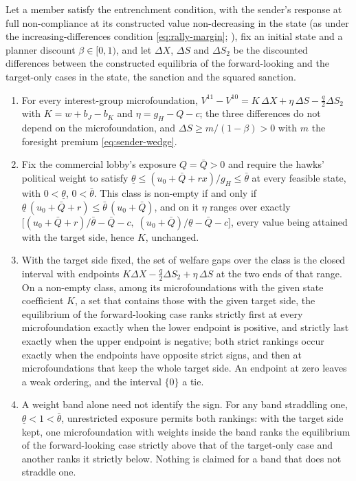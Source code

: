 \begin{proposition}
\label{prop:welfare-interval}
Let a member satisfy the entrenchment condition, with the sender's response at
full non-compliance at its constructed value non-decreasing in the state (as under
the increasing-differences condition \eqref{eq:rally-margin}; ), fix an
initial state and a planner discount
$\beta\in[0,1)$, and let $\Delta X$, $\Delta S$ and
$\Delta S_2$ be the discounted differences between the constructed equilibria of the forward-looking and the
target-only cases in the state, the sanction and the squared sanction.
\begin{enumerate}[label=(\roman*)]
\item For every interest-group microfoundation,
$V^{11}-V^{10}=K\,\Delta X+\eta\,\Delta S-\tfrac q2\Delta S_2$ with
$K=w+b_J-b_K$ and $\eta=g_H-Q-c$; the three differences do not depend on the
microfoundation, and $\Delta S\ge m/(1-\beta)>0$ with $m$ the foresight premium
\eqref{eq:sender-wedge}.
\item Fix the commercial lobby's exposure $Q=\bar Q>0$ and require the hawks'
political weight to satisfy $\underline\theta\le(u_0+\bar Q+rx)/g_H\le\bar\theta$
at every feasible state, with $0<\underline\theta$, $0<\bar\theta$. This class is
non-empty if and only if
$\underline\theta\,(u_0+\bar Q+r)\le\bar\theta\,(u_0+\bar Q)$, and on it $\eta$
ranges over exactly
$\bigl[(u_0+\bar Q+r)/\bar\theta-\bar Q-c,\;(u_0+\bar Q)/\underline\theta-\bar Q-c\bigr]$,
every value being attained with the target side, hence $K$, unchanged.
\item With the target side fixed, the set of welfare gaps over the class is the
closed interval with endpoints
$K\Delta X-\tfrac q2\Delta S_2+\eta\,\Delta S$ at the two ends of that range.
On a non-empty class, among its microfoundations with the given state coefficient
$K$, a set that contains those with the given target side, the
equilibrium of the forward-looking case ranks strictly first at every microfoundation exactly when
the lower endpoint is positive, and strictly last exactly when the upper
endpoint is negative; both strict rankings occur exactly when the endpoints have
opposite strict signs, and then at microfoundations that keep the whole target side.
An endpoint at zero leaves a weak ordering, and the interval $\{0\}$ a tie.
\item A weight band alone need not identify the sign. For any band straddling
one, $\underline\theta<1<\bar\theta$, unrestricted exposure permits both
rankings: with the target side kept, one microfoundation with weights inside the
band ranks the equilibrium of the forward-looking case strictly above that of the target-only case and
another ranks it strictly below. Nothing is claimed for a band that does not
straddle one.
\end{enumerate}
\end{proposition}

